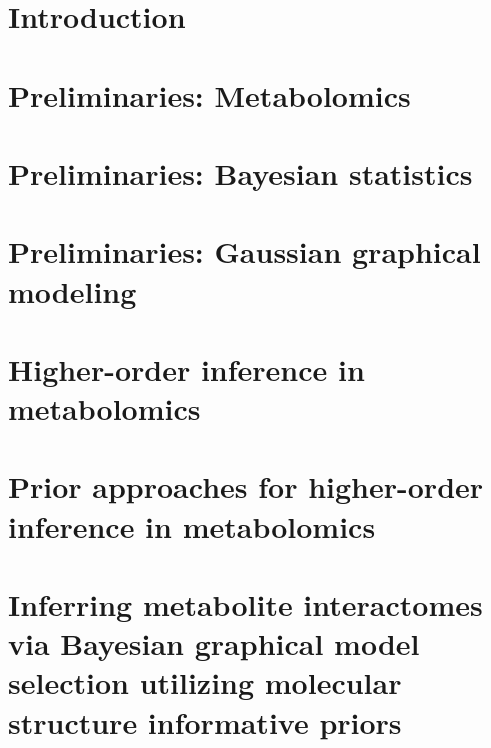 \documentclass[final]{ulthesis}
\begin{document}
\tableofcontents \clearpage
\listoftables \clearpage
\listoffigures \clearpage

\mainmatter


\chapter{Introduction}


\chapter{Preliminaries: Metabolomics}


\chapter{Preliminaries: Bayesian statistics}


\chapter{Preliminaries: Gaussian graphical modeling}


\chapter{Higher-order inference in metabolomics}


\chapter{Prior approaches for higher-order inference in metabolomics}


\chapter{Inferring metabolite interactomes via Bayesian graphical model selection utilizing molecular structure informative priors}

\end{document}
